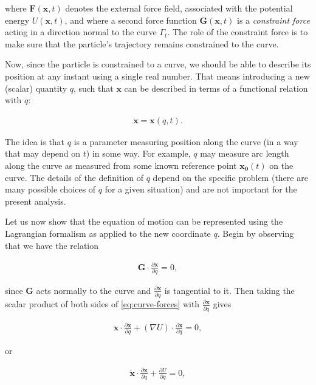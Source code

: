 \documentclass[11pt]{report}
\theoremstyle{plain}
\theoremstyle{definition}
\begin{document}
\noindent where $\mathbf{F}(\mathbf{x},t)$ denotes the external
force field, associated with the potential energy
$U(\mathbf{x},t)$, and where a second force function
$\mathbf{G}(\mathbf{x},t)$ is a \emph{constraint force}
acting in a direction normal to the curve $\Gamma_t$.
The role of the constraint force is to make sure that
the particle's trajectory remains constrained to the
curve.

Now, since the particle is constrained to a curve, we
should be able to describe its position at any instant
using a single real number. That means introducing a
new (scalar) quantity $q$, such that $\mathbf{x}$ can
be described in terms of a functional relation with
$q$:

\begin{align*}
\mathbf{x} = \mathbf{x}(q,t).
\end{align*}

\noindent The idea is that $q$ is a parameter measuring position
along the curve (in a way that may depend on $t$) in
some way. For example, $q$ may measure arc length
along the curve as measured from some known reference
point $\mathbf{x_0}(t)$ on the curve. The details of
the definition of $q$ depend on the specific problem
(there are many possible choices of $q$ for a given
situation) and are not important for the present
analysis.

Let us now show that the equation of motion can be
represented using the Lagrangian formalism as applied
to the new coordinate $q$. Begin by observing that we
have the relation

\begin{align*}
\mathbf{G}\cdot \frac{\partial \mathbf{x}}{\partial q} = 0,
\end{align*}

\noindent since $\mathbf{G}$ acts normally to the curve and
$\frac{\partial \mathbf{x}}{\partial q}$ is tangential
to it. Then taking the scalar product of both sides of
\eqref{eq:curve-forces} with
$\frac{\partial \mathbf{x}}{\partial q}$ gives

\begin{align*}
\ddot{\mathbf{x}} \cdot \frac{\partial \mathbf{x}}{\partial q} + (\nabla U) \cdot \frac{\partial \mathbf{x}}{\partial q} = 0,
\end{align*}

\noindent or

\begin{equation*} \tag{9}\label{eq:curveeq1}
\begin{split}
\ddot{\mathbf{x}} \cdot \frac{\partial \mathbf{x}}{\partial q} + \frac{\partial U}{\partial q} = 0,
\end{split}
\end{equation*}
\end{document}
